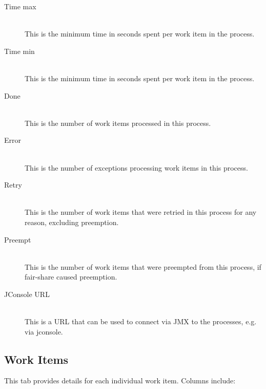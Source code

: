 \begin{description}
          \item[Time max] \hfill \\
            This is the minimum time in seconds spent per work item in the process.
            
          \item[Time min] \hfill \\
            This is the minimum time in seconds spent per work item in the process.
            
          \item[Done] \hfill \\
            This is the number of work items processed in this process.
            
          \item[Error] \hfill \\
            This is the number of exceptions processing work items in this process.
            
          \item[Retry] \hfill \\
            This is the number of work items that were retried in this process for any reason, excluding
            preemption.
            
          \item[Preempt] \hfill \\
            This is the number of work items that were preempted from this process, if
            fair-share caused preemption.
            
          \item[JConsole URL] \hfill \\
            This is a URL that can be used to connect via JMX to the processes, e.g. via
            jconsole.

      \end{description}

   \subsection{Work Items}
   \label{sec:ws-work-items}
   This tab provides details for each individual work item.  Columns include:

